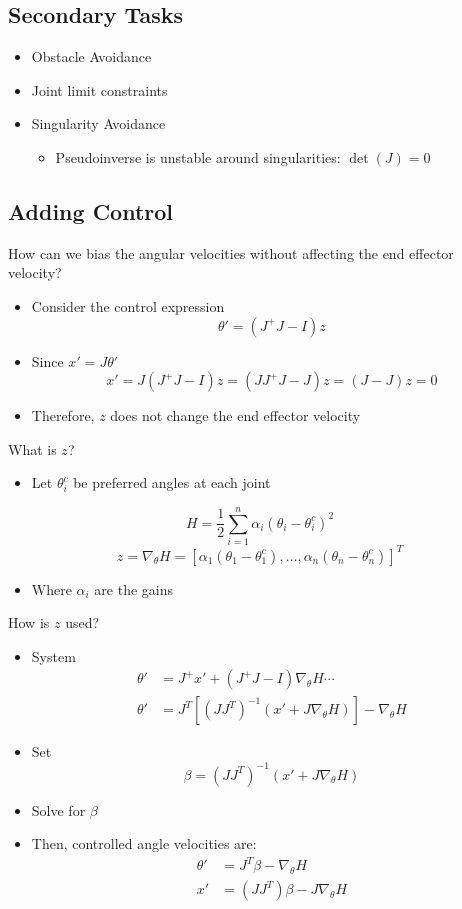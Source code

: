 \documentclass{article}
\begin{document}
\subsection*{Secondary Tasks}
\begin{itemize}
    \item Obstacle Avoidance
    \item Joint limit constraints
    \item Singularity Avoidance
    \begin{itemize}
        \item Pseudoinverse is unstable around singularities: $\det(J) = 0$
    \end{itemize}
\end{itemize}

\subsection*{Adding Control}
How can we bias the angular velocities without affecting the end effector velocity?
\begin{itemize}
    \item Consider the control expression
    \[\theta' = (J^+ J - I)z\]
    \item Since $x' = J\theta'$
    \[x' = J(J^+ J - I) z = (JJ^+J - J)z = (J - J)z = 0\]
    \item Therefore, $z$ does not change the end effector velocity
\end{itemize}
What is $z$?
\begin{itemize}
    \item Let $\theta_i^c$ be preferred angles at each joint
\end{itemize}
\[H = \frac{1}{2} \sum_{i = 1}^n \alpha_i(\theta_i - \theta_i^c)^2\]
\[z = \nabla_\theta H = [\alpha_1(\theta_1 - \theta_1^c), \dots, \alpha_n(\theta_n - \theta_n^c)]^T\]
\begin{itemize}
    \item Where $\alpha_i$ are the gains
\end{itemize}
How is $z$ used?
\begin{itemize}
    \item System
    \begin{align*}
        \theta' &= J^+ x' + (J^+J - I) \nabla_\theta H\cdots\\
        \theta' &= J^T[(JJ^T)^{-1}(x' + J\nabla_\theta H)] - \nabla_\theta H
    \end{align*}
    \item Set
        \[\beta = (JJ^T)^{-1}(x' + J\nabla_\theta H)\]
    \item Solve for $\beta$
    \item Then, controlled angle velocities are:
    \begin{align*}
        \theta' &= J^T\beta - \nabla_\theta H\\
        x' &= (JJ^T)\beta - J\nabla_\theta H
    \end{align*}
\end{itemize}
\end{document}

